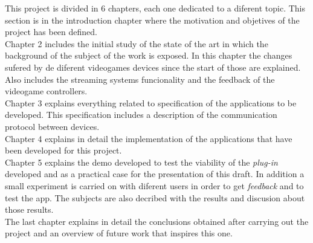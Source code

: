 This project is divided in 6 chapters, each one dedicated to a diferent topic. This section is in the introduction chapter where the motivation and objetives of the project has been defined.\\

Chapter 2 includes the initial study of the state of the art in which the background of the subject of the work is exposed. In this chapter the changes sufered by de diferent videogames devices since the start of those are explained. Also includes the streaming systems funcionality and the feedback of the videogame controllers.\\

Chapter 3 explains everything related to specification of the applications to be developed. This specification includes a description of the communication protocol between devices. \\

Chapter 4 explains in detail the implementation of the applications that have been developed for this project. \\

Chapter 5 explains the demo developed to test the viability of the \textit{plug-in} developed and as a practical case for the presentation of this draft. In addition a small experiment is carried on with diferent users in order to get \textit{feedback} and to test the app. The subjects are also decribed with the results and discusion about those results.\\

The last chapter explains in detail the conclusions obtained after carrying out the project and an overview of future work that inspires this one.\\

